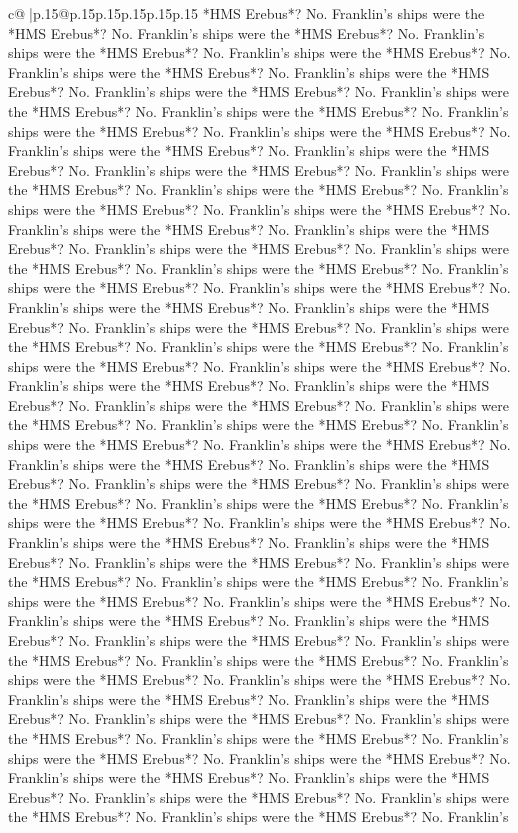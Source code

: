 \documentclass{article}
\begin{document}
{\begin{supertabular}{c@{$\;$}|p{.15\linewidth}@{}p{.15\linewidth}p{.15\linewidth}p{.15\linewidth}p{.15\linewidth}p{.15\linewidth}}
{{{*HMS Erebus*? No. Franklin's ships were the *HMS Erebus*? No. Franklin's ships were the *HMS Erebus*? No. Franklin's ships were the *HMS Erebus*? No. Franklin's ships were the *HMS Erebus*? No. Franklin's ships were the *HMS Erebus*? No. Franklin's ships were the *HMS Erebus*? No. Franklin's ships were the *HMS Erebus*? No. Franklin's ships were the *HMS Erebus*? No. Franklin's ships were the *HMS Erebus*? No. Franklin's ships were the *HMS Erebus*? No. Franklin's ships were the *HMS Erebus*? No. Franklin's ships were the *HMS Erebus*? No. Franklin's ships were the *HMS Erebus*? No. Franklin's ships were the *HMS Erebus*? No. Franklin's ships were the *HMS Erebus*? No. Franklin's ships were the *HMS Erebus*? No. Franklin's ships were the *HMS Erebus*? No. Franklin's ships were the *HMS Erebus*? No. Franklin's ships were the *HMS Erebus*? No. Franklin's ships were the *HMS Erebus*? No. Franklin's ships were the *HMS Erebus*? No. Franklin's ships were the *HMS Erebus*? No. Franklin's ships were the *HMS Erebus*? No. Franklin's ships were the *HMS Erebus*? No. Franklin's ships were the *HMS Erebus*? No. Franklin's ships were the *HMS Erebus*? No. Franklin's ships were the *HMS Erebus*? No. Franklin's ships were the *HMS Erebus*? No. Franklin's ships were the *HMS Erebus*? No. Franklin's ships were the *HMS Erebus*? No. Franklin's ships were the *HMS Erebus*? No. Franklin's ships were the *HMS Erebus*? No. Franklin's ships were the *HMS Erebus*? No. Franklin's ships were the *HMS Erebus*? No. Franklin's ships were the *HMS Erebus*? No. Franklin's ships were the *HMS Erebus*? No. Franklin's ships were the *HMS Erebus*? No. Franklin's ships were the *HMS Erebus*? No. Franklin's ships were the *HMS Erebus*? No. Franklin's ships were the *HMS Erebus*? No. Franklin's ships were the *HMS Erebus*? No. Franklin's ships were the *HMS Erebus*? No. Franklin's ships were the *HMS Erebus*? No. Franklin's ships were the *HMS Erebus*? No. Franklin's ships were the *HMS Erebus*? No. Franklin's ships were the *HMS Erebus*? No. Franklin's ships were the *HMS Erebus*? No. Franklin's ships were the *HMS Erebus*? No. Franklin's ships were the *HMS Erebus*? No. Franklin's ships were the *HMS Erebus*? No. Franklin's ships were the *HMS Erebus*? No. Franklin's ships were the *HMS Erebus*? No. Franklin's ships were the *HMS Erebus*? No. Franklin's ships were the *HMS Erebus*? No. Franklin's ships were the *HMS Erebus*? No. Franklin's ships were the *HMS Erebus*? No. Franklin's ships were the *HMS Erebus*? No. Franklin's ships were the *HMS Erebus*? No. Franklin's ships were the *HMS Erebus*? No. Franklin's ships were the *HMS Erebus*? No. Franklin's ships were the *HMS Erebus*? No. Franklin's ships were the *HMS Erebus*? No. Franklin's ships were the *HMS Erebus*? No. Franklin's ships were the *HMS Erebus*? No. Franklin's ships were the *HMS Erebus*? No. Franklin's ships were the *HMS Erebus*? No. Franklin's ships were the *HMS Erebus*? No. Franklin's ships were the *HMS Erebus*? No. Franklin's ships were the *HMS Erebus*? No. Franklin's ships were the *HMS Erebus*? No. Franklin's ships were the *HMS Erebus*? No. Franklin's ships were the *HMS Erebus*? No. Franklin's }}}
\end{supertabular}}
\end{document}
